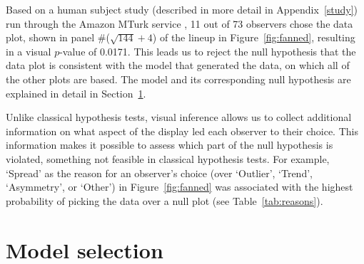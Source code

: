 \documentclass[12pt]{article} %
\newcommand{\alnote}[1]{\todo[inline,color=green!40]{#1}} %
\newcommand{\hhnote}[1]{\todo[inline,color=orange!40]{#1}}
\begin{document}
Based on a human subject study (described in more detail in Appendix~\ref{study}) run through the Amazon MTurk service \citep{amazon}, 11 out of 73 observers  chose the  data plot, shown in panel  \#($\sqrt{144} + 4$) of the lineup in Figure~\ref{fig:fanned}, resulting in a visual $p$-value of 0.0171. This leads us to reject the null hypothesis that the data plot %
is consistent with the model that generated the data, on which all of the other plots are based. The  model and its corresponding null hypothesis  are explained in detail in Section~\ref{sec:select}.  


Unlike classical hypothesis tests, visual inference  allows us to collect additional information on what aspect of the display led each observer to their choice. 
This  information makes it possible to assess which part of the null hypothesis is violated, something not feasible in classical hypothesis tests. For example,  `Spread' as the reason for an observer's choice (over `Outlier', `Trend',  `Asymmetry', or `Other') in Figure~\ref{fig:fanned} was associated with the highest probability of picking the data over a null plot (see Table~\ref{tab:reasons}).




\section{Model selection}\label{sec:select}
\end{document}
